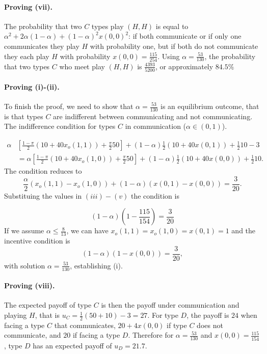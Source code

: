 \documentclass[12pt]{article}
\theoremstyle{break}
\begin{document}
\paragraph{Proving (vii).}	The probability that two $C$ types play $(H,H)$ is equal to $\alpha^2+2\alpha(1-\alpha)+(1-\alpha)^2 x(0,0)^2$: if both communicate or if only one communicates they play $H$ with probability one, but if both do not communicate they each play $H$ with probability $x(0,0)=\frac{115}{254}$. Using $\alpha=\frac{53}{130}$, the probability that two types $C$ who meet play $(H,H)$ is $\frac{4393}{5200}$, or approximately $84.5\%$



\paragraph{Proving (i)-(ii).} To finish the proof, we need to show that $\alpha=\frac{53}{130}$ is an equilibrium outcome, that is that types $C$ are indifferent between communicating and not communicating. The indifference condition for types $C$ in communication ($\alpha\in(0,1)$).

\begin{align*}
	\alpha&\left[\frac{1-\pi}{2}(10+40 x_o(1,1))+\frac{\pi}{2}50\right]+(1-\alpha)\frac{1}{2}(10+40x(0,1))+\frac{1}{2}10-3\\
		&=\alpha\left[\frac{1-\pi}{2}(10+40 x_o(1,0))+\frac{\pi}{2}50\right]+(1-\alpha)\frac{1}{2}(10+40x(0,0))+\frac{1}{2}10.
\end{align*}
The condition reduces to 
\begin{equation}\label{IC-comm}
	\frac{\alpha}{2} (x_o(1,1)-x_o(1,0))+(1-\alpha) (x(0,1)-x(0,0))=\frac{3}{20}.	
\end{equation}
%
Substituing the values in $(iii)-(v)$ the condition is 

%
\[
(1-\alpha)\left(1-\frac{115}{154}\right)=\frac{3}{20}
\]
%
If we assume $\alpha\leq \frac{8}{13}$, we can have $x_o(1,1)=x_o(1,0)=x(0,1)=1$ and the incentive condition is 
\[
(1-\alpha) (1-x(0,0))=\frac{3}{20},
\]
with solution $\alpha=\frac{53}{130}$, establishing (i).

\paragraph{Proving (viii).} The expected payoff of type $C$ is then the payoff under communication and playing $H$, that is $u_C=\frac{1}{2}(50+10)-3=27$. For type $D$, the payoff is $24$ when facing a type $C$ that communicates, $20+4x(0,0)$ if type $C$ does not communicate, and $20$ if facing a type $D$. Therefore for $\alpha=\frac{53}{130}$ and $x(0,0)=\frac{115}{154}$, type $D$ has an expected payoff of $u_D=21.7$.
%
\end{document}
